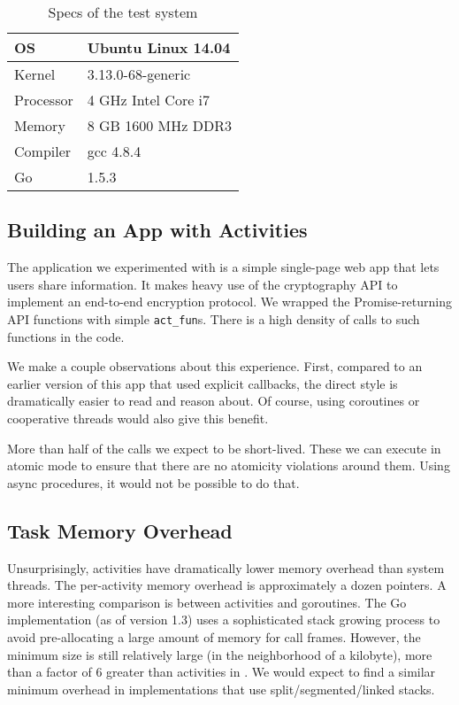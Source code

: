 \documentclass[a4paper,UKenglish,cleveref, autoref]{lipics-v2019}
\begin{document}
\begin{table}
  \centering
  \begin{tabular}{|l|l|}
    \hline
    OS & Ubuntu Linux 14.04 \\
    \hline
    Kernel & 3.13.0-68-generic \\
    \hline
    Processor & 4 GHz Intel Core i7 \\
    \hline
    Memory & 8 GB 1600 MHz DDR3 \\
    \hline
    Compiler & gcc 4.8.4 \\
    \hline
    Go & 1.5.3 \\
    \hline
  \end{tabular}
  \caption{Specs of the test system}
  \label{table:specs}
\end{table}

\subsection{Building an App with Activities}

The application we experimented with is a simple single-page web app that lets users share information.
It makes heavy use of the cryptography API to implement an end-to-end encryption protocol.
We wrapped the Promise-returning API functions with simple \texttt{act\_fun}s.
There is a high density of calls to such functions in the code.

We make a couple observations about this experience.
First, compared to an earlier version of this app that used explicit callbacks, the direct style is dramatically easier to read and reason about.
Of course, using coroutines or cooperative threads would also give this benefit.

More than half of the calls we expect to be short-lived.
These we can execute in atomic mode to ensure that there are no atomicity violations around them.
Using async procedures, it would not be possible to do that.


\subsection{Task Memory Overhead}

Unsurprisingly, activities have dramatically lower memory overhead than system threads.
The per-activity memory overhead is approximately a dozen pointers.
A more interesting comparison is between activities and goroutines.
The Go implementation (as of version 1.3) uses a sophisticated stack growing process to avoid pre-allocating a large amount of memory for call frames.
However, the minimum size is still relatively large (in the neighborhood of a kilobyte), more than a factor of 6 greater than activities in \charcoal{}.
We would expect to find a similar minimum overhead in implementations that use split/segmented/linked stacks.
\end{document}
